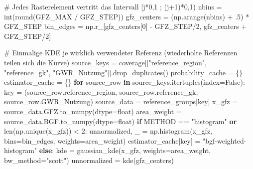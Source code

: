 \documentclass[
  ngerman,
  a4paper,
  DIV=11]{scrreprt}
\newenvironment{Shaded}{\begin{snugshade}}{\end{snugshade}}
\newcommand{\BuiltInTok}[1]{\textcolor[rgb]{0.00,0.23,0.31}{#1}}
\newcommand{\CommentTok}[1]{\textcolor[rgb]{0.37,0.37,0.37}{#1}}
\newcommand{\ControlFlowTok}[1]{\textcolor[rgb]{0.00,0.23,0.31}{\textbf{#1}}}
\newcommand{\DecValTok}[1]{\textcolor[rgb]{0.68,0.00,0.00}{#1}}
\newcommand{\FloatTok}[1]{\textcolor[rgb]{0.68,0.00,0.00}{#1}}
\newcommand{\KeywordTok}[1]{\textcolor[rgb]{0.00,0.23,0.31}{\textbf{#1}}}
\newcommand{\NormalTok}[1]{\textcolor[rgb]{0.00,0.23,0.31}{#1}}
\newcommand{\OperatorTok}[1]{\textcolor[rgb]{0.37,0.37,0.37}{#1}}
\newcommand{\StringTok}[1]{\textcolor[rgb]{0.13,0.47,0.30}{#1}}
\newcommand{\VariableTok}[1]{\textcolor[rgb]{0.07,0.07,0.07}{#1}}
\begin{document}
\begin{Shaded}
\begin{Highlighting}[]
\CommentTok{\# Jedes Rasterelement vertritt das Intervall [j*0,1 ; (j+1)*0,1)}
\NormalTok{nbins }\OperatorTok{=} \BuiltInTok{int}\NormalTok{(}\BuiltInTok{round}\NormalTok{(GFZ\_MAX }\OperatorTok{/}\NormalTok{ GFZ\_STEP))}
\NormalTok{gfz\_centers }\OperatorTok{=}\NormalTok{ (np.arange(nbins) }\OperatorTok{+} \FloatTok{.5}\NormalTok{) }\OperatorTok{*}\NormalTok{ GFZ\_STEP}
\NormalTok{bin\_edges }\OperatorTok{=}\NormalTok{ np.r\_[gfz\_centers[}\DecValTok{0}\NormalTok{] }\OperatorTok{{-}}\NormalTok{ GFZ\_STEP}\OperatorTok{/}\DecValTok{2}\NormalTok{, gfz\_centers }\OperatorTok{+}\NormalTok{ GFZ\_STEP}\OperatorTok{/}\DecValTok{2}\NormalTok{]}

\CommentTok{\# Einmalige KDE je wirklich verwendeter Referenz (wiederholte Referenzen teilen sich die Kurve)}
\NormalTok{source\_keys }\OperatorTok{=}\NormalTok{ coverage[[}\StringTok{"reference\_region"}\NormalTok{, }\StringTok{"reference\_gk"}\NormalTok{, }\StringTok{"GWR\_Nutzung"}\NormalTok{]].drop\_duplicates()}
\NormalTok{probability\_cache }\OperatorTok{=}\NormalTok{ \{\}}
\NormalTok{estimator\_cache }\OperatorTok{=}\NormalTok{ \{\}}
\ControlFlowTok{for}\NormalTok{ source\_row }\KeywordTok{in}\NormalTok{ source\_keys.itertuples(index}\OperatorTok{=}\VariableTok{False}\NormalTok{):}
\NormalTok{    key }\OperatorTok{=}\NormalTok{ (source\_row.reference\_region, source\_row.reference\_gk, source\_row.GWR\_Nutzung)}
\NormalTok{    source\_data }\OperatorTok{=}\NormalTok{ reference\_groups[key]}
\NormalTok{    x\_gfz }\OperatorTok{=}\NormalTok{ source\_data.GFZ.to\_numpy(dtype}\OperatorTok{=}\BuiltInTok{float}\NormalTok{)}
\NormalTok{    area\_weight }\OperatorTok{=}\NormalTok{ source\_data.BGF.to\_numpy(dtype}\OperatorTok{=}\BuiltInTok{float}\NormalTok{)}
    \ControlFlowTok{if}\NormalTok{ METHOD }\OperatorTok{==} \StringTok{"histogram"} \KeywordTok{or} \BuiltInTok{len}\NormalTok{(np.unique(x\_gfz)) }\OperatorTok{\textless{}} \DecValTok{2}\NormalTok{:}
\NormalTok{        unnormalized, \_ }\OperatorTok{=}\NormalTok{ np.histogram(x\_gfz, bins}\OperatorTok{=}\NormalTok{bin\_edges, weights}\OperatorTok{=}\NormalTok{area\_weight)}
\NormalTok{        estimator\_cache[key] }\OperatorTok{=} \StringTok{"bgf{-}weighted{-}histogram"}
    \ControlFlowTok{else}\NormalTok{:}
\NormalTok{        kde }\OperatorTok{=}\NormalTok{ gaussian\_kde(x\_gfz, weights}\OperatorTok{=}\NormalTok{area\_weight, bw\_method}\OperatorTok{=}\StringTok{"scott"}\NormalTok{)}
\NormalTok{        unnormalized }\OperatorTok{=}\NormalTok{ kde(gfz\_centers)}

\end{Highlighting}
\end{Shaded}
\end{document}
